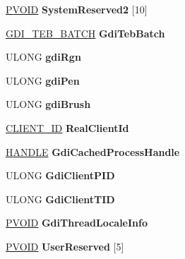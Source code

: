 \begin{DoxyCompactItemize}
\hyperlink{interfacevoid}{P\+V\+O\+ID} {\bfseries System\+Reserved2} \mbox{[}10\mbox{]}
\item 
\mbox{\label{struct___t_e_b_a65775f9712a50a985ea8b546fb92d68c}} 
\hyperlink{struct___g_d_i___t_e_b___b_a_t_c_h}{G\+D\+I\+\_\+\+T\+E\+B\+\_\+\+B\+A\+T\+CH} {\bfseries Gdi\+Teb\+Batch}
\item 
\mbox{\label{struct___t_e_b_a537098a538fdfa0f573ea5f85fe76f92}} 
U\+L\+O\+NG {\bfseries gdi\+Rgn}
\item 
\mbox{\label{struct___t_e_b_a87cdc198a52be5adbda7237b4af83f5a}} 
U\+L\+O\+NG {\bfseries gdi\+Pen}
\item 
\mbox{\label{struct___t_e_b_ab54d7bfcb951889ed2f98ae617a2b236}} 
U\+L\+O\+NG {\bfseries gdi\+Brush}
\item 
\mbox{\label{struct___t_e_b_ac316008dfc6abaaefb52360510801cbd}} 
\hyperlink{struct___c_l_i_e_n_t___i_d}{C\+L\+I\+E\+N\+T\+\_\+\+ID} {\bfseries Real\+Client\+Id}
\item 
\mbox{\label{struct___t_e_b_a265c6f80f33164961579bf0cf9799c6a}} 
\hyperlink{interfacevoid}{H\+A\+N\+D\+LE} {\bfseries Gdi\+Cached\+Process\+Handle}
\item 
\mbox{\label{struct___t_e_b_a78d12633afc4a643bae83d82e9f80fa6}} 
U\+L\+O\+NG {\bfseries Gdi\+Client\+P\+ID}
\item 
\mbox{\label{struct___t_e_b_a7471bf030f8d5f68af05b9b034080400}} 
U\+L\+O\+NG {\bfseries Gdi\+Client\+T\+ID}
\item 
\mbox{\label{struct___t_e_b_ac67ef3ed8850e3a9dd35957154503baf}} 
\hyperlink{interfacevoid}{P\+V\+O\+ID} {\bfseries Gdi\+Thread\+Locale\+Info}
\item 
\mbox{\label{struct___t_e_b_a059cba7437c9df55576ad8a5c43bdee0}} 
\hyperlink{interfacevoid}{P\+V\+O\+ID} {\bfseries User\+Reserved} \mbox{[}5\mbox{]}
\item 
\mbox{\label{struct___t_e_b_a720f7f6ca51f583b8d905faa29ca7421}} 

\end{DoxyCompactItemize}

